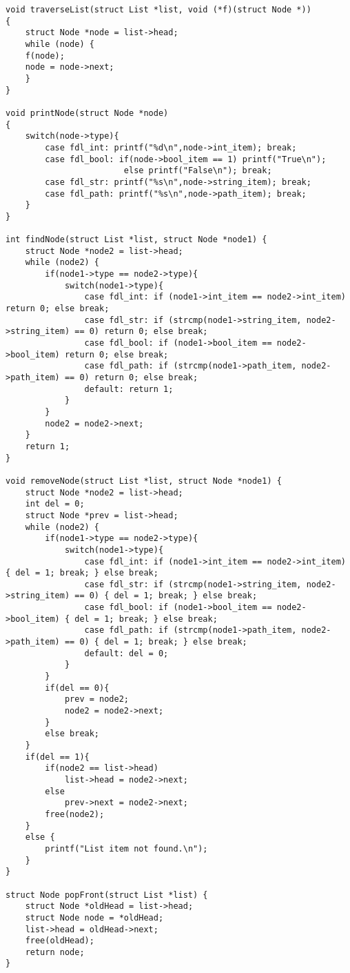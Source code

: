 \documentclass[11pt]{article}
\begin{document}
\begin{listing}[H]
  \begin{verbatim}
void traverseList(struct List *list, void (*f)(struct Node *))
{
    struct Node *node = list->head;
    while (node) {
    f(node);
    node = node->next;
    }
}

void printNode(struct Node *node)
{
    switch(node->type){
        case fdl_int: printf("%d\n",node->int_item); break;
        case fdl_bool: if(node->bool_item == 1) printf("True\n");
                        else printf("False\n"); break;
        case fdl_str: printf("%s\n",node->string_item); break;
        case fdl_path: printf("%s\n",node->path_item); break;
    }
}

int findNode(struct List *list, struct Node *node1) {
    struct Node *node2 = list->head;
    while (node2) {
        if(node1->type == node2->type){
            switch(node1->type){
                case fdl_int: if (node1->int_item == node2->int_item) return 0; else break;
                case fdl_str: if (strcmp(node1->string_item, node2->string_item) == 0) return 0; else break;
                case fdl_bool: if (node1->bool_item == node2->bool_item) return 0; else break;
                case fdl_path: if (strcmp(node1->path_item, node2->path_item) == 0) return 0; else break;
                default: return 1;
            }
        }
        node2 = node2->next;
    }
    return 1;
}

void removeNode(struct List *list, struct Node *node1) {
    struct Node *node2 = list->head;
    int del = 0;
    struct Node *prev = list->head;
    while (node2) {
        if(node1->type == node2->type){
            switch(node1->type){
                case fdl_int: if (node1->int_item == node2->int_item) { del = 1; break; } else break;
                case fdl_str: if (strcmp(node1->string_item, node2->string_item) == 0) { del = 1; break; } else break;
                case fdl_bool: if (node1->bool_item == node2->bool_item) { del = 1; break; } else break;
                case fdl_path: if (strcmp(node1->path_item, node2->path_item) == 0) { del = 1; break; } else break;
                default: del = 0;
            }
        }
        if(del == 0){
            prev = node2;
            node2 = node2->next;
        }
        else break;
    }
    if(del == 1){
        if(node2 == list->head)
            list->head = node2->next;
        else
            prev->next = node2->next;
        free(node2);
    }
    else {
        printf("List item not found.\n");
    }
}

struct Node popFront(struct List *list) {
    struct Node *oldHead = list->head;
    struct Node node = *oldHead;
    list->head = oldHead->next;
    free(oldHead);
    return node;
}
  \end{verbatim}
\end{listing}
\end{document}
